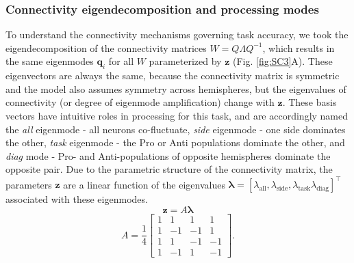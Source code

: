\documentclass[11pt]{article}
\begin{document}
\subsubsection{Connectivity eigendecomposition and processing modes} \label{methods_sc_eig}
To understand the connectivity mechanisms governing task accuracy, we took the eigendecomposition of the connectivity matrices $W = Q\Lambda Q^{-1}$, which results in the same eigenmodes $\mathbf{q}_i$ for all $W$ parameterized by $\mathbf{z}$ (Fig. \ref{fig:SC3}A). 
These eigenvectors are always the same, because the connectivity matrix is symmetric and the model also assumes symmetry across hemispheres, but the eigenvalues of connectivity (or degree of eigenmode amplification) change with $\mathbf{z}$.
These basis vectors have intuitive roles in processing for this task, and are accordingly named the \textit{all} eigenmode - all neurons co-fluctuate, \textit{side} eigenmode - one side dominates the other, \textit{task} eigenmode - the Pro or Anti populations dominate the other, and \textit{diag} mode - Pro- and Anti-populations of opposite hemispheres dominate the opposite pair. 
Due to the parametric structure of the connectivity matrix, the parameters $\mathbf{z}$ are a linear function of the eigenvalues $\bm{\lambda} = [\lambda_{\text{all}}, \lambda_{\text{side}}, \lambda_{\text{task}}\lambda_{\text{diag}}]^\top$ associated with these eigenmodes.
\begin{equation}
\mathbf{z} = A\bm{\lambda}
\end{equation}
\begin{equation}
A = \frac{1}{4} \begin{bmatrix} 1 & 1 & 1 & 1 \\ 1 & -1 & -1 & 1 \\ 1 & 1 & -1 & -1 \\ 1 & -1 & 1 & -1 \end{bmatrix}.
\end{equation}
\end{document}
